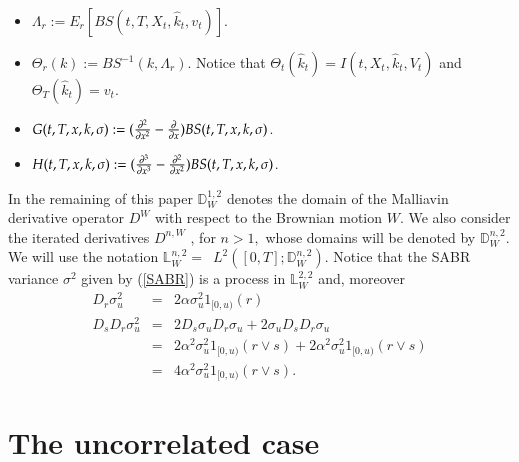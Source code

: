 \documentclass[11pt]{article}
\begin{document}
\begin{itemize}
\item $
\Lambda _{r}:=E_{r}\left[ BS\left( t,T,X_t,\hat{k}_t,v_{t}\right) \right]$.

\item $
\Theta_{r}(k):=BS^{-1}(k,\Lambda_r)$. Notice that $\Theta_{t}(\hat{k}_t)=I(t,X_t,\hat{k}_t,V_t)$ and $\Theta_{T}(\hat{k}_t)=v_t$.

\item $G(t,T,x,k,\sigma ):=( \frac{\partial ^{2}}{\partial x^{2}}-\frac{%
\partial}{\partial x}) BS(t,T,x,k,\sigma )$.
\item $H(t,T,x,k,\sigma ):=( \frac{\partial ^{3}}{\partial x^{3}}-\frac{%
\partial ^{2}}{\partial x^{2}}) BS(t,T,x,k,\sigma )$.

\end{itemize}


In the remaining of this paper $\mathbb{D}_{W}^{1,2}$ denotes the domain of the
Malliavin derivative operator $D^{W}$ with respect to the Brownian motion $%
W. $ We also consider the
iterated derivatives $D^{n,W}$ , for $n>1,$ whose domains will be denoted by 
$\mathbb{D}_{W}^{n,2}$. We will use the notation $\mathbb{L}_{W}^{n,2}=$\ $%
L^{2}(\left[ 0,T\right] ;\mathbb{D}_{W}^{n,2})$. Notice that the SABR variance $\sigma^2$ given by (\ref{SABR}) is a process in $\mathbb{L}_{W}^{2,2}$ and, moreover
\begin{eqnarray}
D_r\sigma_u^2 &=& 2\alpha \sigma_u^2 1_{[0,u)}(r)\\
D_s D_r \sigma_u^2 &=& 2 D_s\sigma_u D_r\sigma_u + 2\sigma_u D_s D_r \sigma_u\nonumber\\
&=& 2 \alpha^2 \sigma_u^2 1_{[0,u)}(r \vee s) + 2 \alpha^2 \sigma_u^2 1_{[0,u)}(r \vee s)\nonumber\\
&=& 4 \alpha^2 \sigma_u^2 1_{[0,u)}(r \vee s).
\end{eqnarray}

\section{The uncorrelated case}
\end{document}
